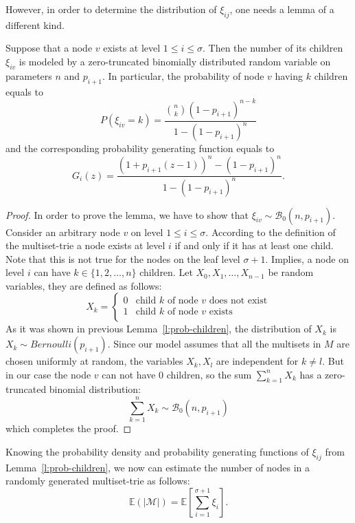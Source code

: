 However, in order to determine the distribution of $\xi_{ij}$, one needs a lemma of a different kind.

\begin{lemma}\label{l:prob-children}
Suppose that a node $v$ exists at level $1\leq i\leq\sigma$.
Then the number of its children $\xi_{iv}$ is modeled by a zero-truncated binomially
distributed random variable on parameters $n$ and $p_{i+1}$. In particular,
the probability of node $v$ having $k$ children equals to
\begin{equation}\label{eq:pdf}
P(\xi_{iv} = k) = \frac{\binom{n}{k} (1-p_{i+1})^{n-k}}{1-(1-p_{i+1})^n}
\end{equation}
and the corresponding probability generating function equals to
\begin{equation}\label{eq:generating_func}
G_i(z) = \frac{(1+p_{i+1}(z-1))^n - (1-p_{i+1})^n}{1-(1-p_{i+1})^n}.
\end{equation}
\end{lemma}
\begin{proof}
In order to prove the lemma, we have to show that
$\xi_{iv}\sim\mathcal{B}_0(n, p_{i+1}).$
Consider an arbitrary node $v$ on level $1\leq i\leq\sigma.$ According to the
definition of the multiset-trie a node exists at level $i$ if and only if
it has at least one child. Note that this is not true for the nodes on the leaf
level $\sigma + 1.$ Implies, a node on level $i$ can have
$k\in\{ 1,2,\ldots, n\}$ children. Let $X_0, X_1, \ldots, X_{n-1}$ be random
variables, they are defined as follows:
\[
X_k = \begin{cases}
0 & \textrm{child $k$ of node $v$ does not exist} \\
1 & \textrm{child $k$ of node $v$ exists} \\
\end{cases}
\]
As it was shown in previous Lemma~\ref{l:prob-children}, the distribution of 
$X_k$ is $X_k\sim Bernoulli(p_{i+1}).$ Since our model assumes that all the 
multisets in $M$ are chosen uniformly at random, the variables 
$X_k,X_l$ are independent for $k\neq l.$ But in our case the node $v$ can not 
have 0 children, so the sum $\sum_{k=1}^n X_k$ has a zero-truncated binomial 
distribution:
%
\[
\sum_{k=1}^n X_k \sim\mathcal{B}_0(n,p_{i+1})
\]
%
which completes the proof.

\end{proof}
%
Knowing the probability density and probability generating functions of $\xi_{ij}$ 
from Lemma~\ref{l:prob-children}, we now can estimate the number of nodes in 
a randomly generated multiset-trie as follows:
%
\begin{equation}\label{eq:num_nodes}
\mathbb{E}( | \mathcal{M} | ) = \mathbb{E}\left[ \sum_{i=1}^{\sigma+1} \xi_i \right].
\end{equation}
%

